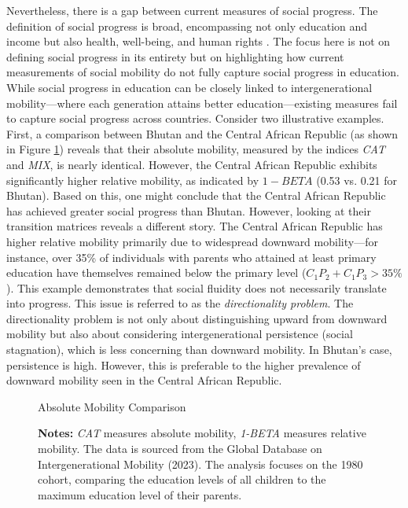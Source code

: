 Nevertheless, there is a gap between current measures of social progress. The definition of social progress is broad, encompassing not only education and income but also health, well-being, and human rights \citep{narayan2018fair, blanden2013cross, deutscher2023measuring}. The focus here is not on defining social progress in its entirety but on highlighting how current measurements of social mobility do not fully capture social progress in education. While social progress in education can be closely linked to intergenerational mobility—where each generation attains better education—existing measures fail to capture social progress across countries. Consider two illustrative examples. First, a comparison between Bhutan and the Central African Republic (as shown in Figure \ref{fig:compare1}) reveals that their absolute mobility, measured by the indices \textit{CAT} and \textit{MIX}, is nearly identical. However, the Central African Republic exhibits significantly higher relative mobility, as indicated by $1 - BETA$ (0.53 vs. 0.21 for Bhutan). Based on this, one might conclude that the Central African Republic has achieved greater social progress than Bhutan. However, looking at their transition matrices reveals a different story. The Central African Republic has higher relative mobility primarily due to widespread downward mobility—for instance, over 35\% of individuals with parents who attained at least primary education have themselves remained below the primary level ($C_1P_2 + C_1P_3 > 35\%$). This example demonstrates that social fluidity does not necessarily translate into progress. This issue is referred to as the \textit{directionality problem}. The directionality problem is not only about distinguishing upward from downward mobility but also about considering intergenerational persistence (social stagnation), which is less concerning than downward mobility. In Bhutan’s case, persistence is high. However, this is preferable to the higher prevalence of downward mobility seen in the Central African Republic.

\begin{figure}[!ht]
    \centering
    \scalebox{0.55}{}
    \caption{Absolute Mobility Comparison}
    \label{fig:compare1}
    \captionsetup{font=footnotesize}
    \caption*{\textbf{Notes:} \textit{CAT} measures absolute mobility, \textit{1-BETA} measures relative mobility. The data is sourced from the Global Database on Intergenerational Mobility (2023). The analysis focuses on the 1980 cohort, comparing the education levels of all children to the maximum education level of their parents.}
\end{figure}

